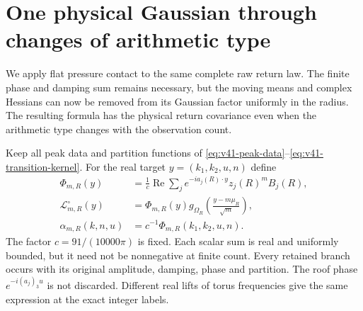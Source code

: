 \section{One physical Gaussian through changes of arithmetic type}
\label{sec:v58-common-raw-law}
We apply flat pressure contact to the same complete raw return law.
The finite phase and damping sum remains necessary, but the moving
means and complex Hessians can now be removed from its Gaussian
factor uniformly in the radius. The resulting formula has the
physical return covariance even when the arithmetic type changes
with the observation count.

Keep all peak data and partition functions of
\eqref{eq:v41-peak-data}--\eqref{eq:v41-transition-kernel}. For the
real target $y=(k_1,k_2,u,n)$ define
\begin{align}
 \Phi_{m,R}(y)&=\frac1c\operatorname{Re}
          \sum_j e^{-ia_j(R)\cdot y}z_j(R)^mB_j(R),
                                      \label{eq:v58-damped-residue}\\
 \mathcal L^\circ_{m,R}(y)&=
         \Phi_{m,R}(y)g_{\Omega_R}
                       \left(\frac{y-m\mu_R}{\sqrt m}\right),
                                      \label{eq:v58-common-kernel}\\
 \alpha_{m,R}(k,n,u)&=c^{-1}\Phi_{m,R}(k_1,k_2,u,n).
                                      \label{eq:v58-return-residue}
\end{align}
The factor $c=91/(10000\pi)$ is fixed. Each scalar sum is real and
uniformly bounded, but it need not be nonnegative at finite count.
Every retained branch occurs with its original amplitude, damping,
phase and partition. The roof phase $e^{-i(a_j)_3u}$ is not discarded.
Different real lifts of torus frequencies give the same expression at
the exact integer labels.

